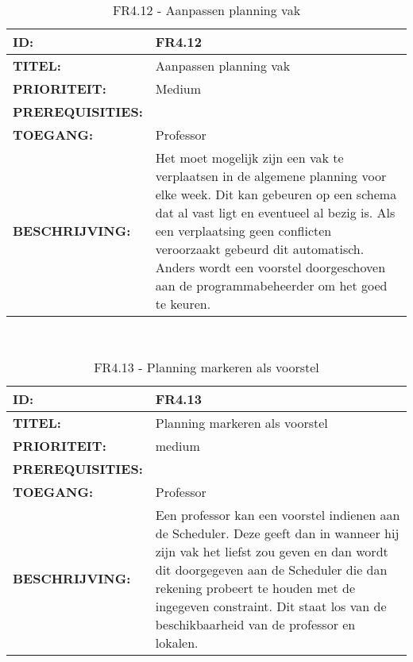 \noindent\begin{table}[H]
            \begin{tabular}{l | p{10cm}}
                \textbf{ID:} & FR4.12 \\ \hline
                \textbf{TITEL:} & Aanpassen planning vak\\ \hline
                \textbf{PRIORITEIT:} &  Medium \\ \hline
                \textbf{PREREQUISITIES:} & \\ \hline
                \textbf{TOEGANG:} & Professor \\ \hline
                \textbf{BESCHRIJVING:} & Het moet mogelijk  zijn een vak te verplaatsen in de algemene planning voor elke week. Dit kan gebeuren op een schema dat al vast ligt en eventueel al bezig is. Als een verplaatsing geen conflicten veroorzaakt gebeurd dit automatisch. Anders wordt een voorstel doorgeschoven aan de programmabeheerder om het goed te keuren.\\
            \end{tabular}\\
            \caption{FR4.12 - Aanpassen planning vak}
            \label{tab:FR4.12 - Aanpassen planning vak}
        \end{table}        
        
\noindent\begin{table}[H]
            \begin{tabular}{l | p{10cm}}
                \textbf{ID:} & FR4.13 \\ \hline
                \textbf{TITEL:} & Planning markeren als voorstel\\ \hline
                \textbf{PRIORITEIT:} &  medium \\ \hline
                \textbf{PREREQUISITIES:} & \\ \hline
                \textbf{TOEGANG:} & Professor \\ \hline
                \textbf{BESCHRIJVING:} & Een professor kan een voorstel indienen aan de Scheduler. 
                                        Deze geeft dan in wanneer hij zijn vak het liefst zou geven en dan wordt dit doorgegeven aan de Scheduler die dan rekening probeert te houden met de ingegeven constraint. Dit staat los van de beschikbaarheid van de professor en lokalen.  \\
            \end{tabular}\\
            \caption{FR4.13 - Planning markeren als voorstel}
            \label{tab:FR4.13 - Planning markeren als voorstel}
        \end{table}

